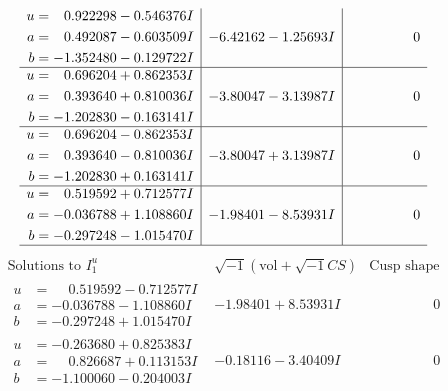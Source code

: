 \documentclass[1p]{elsarticle_modified}
\theoremstyle{definition}
\newcommand{\I}{\sqrt{-1}}
\begin{document}
$$\begin{array}{c|c|c}
\begin{aligned}
u &= \phantom{-}0.922298 - 0.546376 I \\
a &= \phantom{-}0.492087 - 0.603509 I \\
b &= -1.352480 - 0.129722 I\end{aligned}
 & -6.42162 - 1.25693 I & \phantom{-0.000000 } 0 \\ \hline\begin{aligned}
u &= \phantom{-}0.696204 + 0.862353 I \\
a &= \phantom{-}0.393640 + 0.810036 I \\
b &= -1.202830 - 0.163141 I\end{aligned}
 & -3.80047 - 3.13987 I & \phantom{-0.000000 } 0 \\ \hline\begin{aligned}
u &= \phantom{-}0.696204 - 0.862353 I \\
a &= \phantom{-}0.393640 - 0.810036 I \\
b &= -1.202830 + 0.163141 I\end{aligned}
 & -3.80047 + 3.13987 I & \phantom{-0.000000 } 0 \\ \hline\begin{aligned}
u &= \phantom{-}0.519592 + 0.712577 I \\
a &= -0.036788 + 1.108860 I \\
b &= -0.297248 - 1.015470 I\end{aligned}
 & -1.98401 - 8.53931 I & \phantom{-0.000000 } 0\\
 \hline 
 \end{array}$$\newpage$$\begin{array}{c|c|c}  
\text{Solutions to }I^u_{1}& \I (\text{vol} + \sqrt{-1}CS) & \text{Cusp shape}\\
 \hline 
\begin{aligned}
u &= \phantom{-}0.519592 - 0.712577 I \\
a &= -0.036788 - 1.108860 I \\
b &= -0.297248 + 1.015470 I\end{aligned}
 & -1.98401 + 8.53931 I & \phantom{-0.000000 } 0 \\ \hline\begin{aligned}
u &= -0.263680 + 0.825383 I \\
a &= \phantom{-}0.826687 + 0.113153 I \\
b &= -1.100060 - 0.204003 I\end{aligned}
 & -0.18116 - 3.40409 I & \phantom{-0.000000 } 0 \\ \hline\begin{aligned}

\end{aligned}
\end{array}$$
\end{document}
